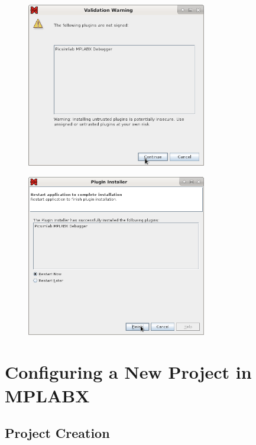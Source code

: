 \begin{figure}[H]
\center
\includegraphics[width=0.7\textwidth]{img/hmd/mplab08.png} 
\end{figure} 

\begin{figure}[H]
\center
\includegraphics[width=0.7\textwidth]{img/hmd/mplab09.png} 
\end{figure} 


\section{Configuring a New Project in MPLABX}

\subsection{Project Creation}

